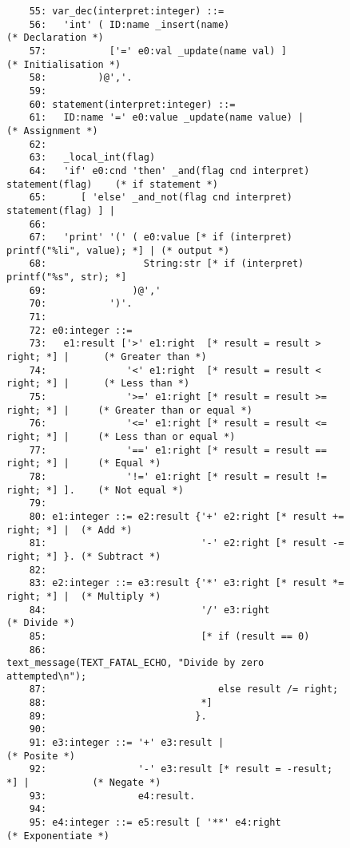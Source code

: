 \begin{figure}
\hspace*{-2cm}
\footnotesize
\begin{minipage}{30cm}
\begin{verbatim}
    55: var_dec(interpret:integer) ::=
    56:   'int' ( ID:name _insert(name)                                  (* Declaration *)
    57:           ['=' e0:val _update(name val) ]                        (* Initialisation *)
    58:         )@','.
    59: 
    60: statement(interpret:integer) ::=
    61:   ID:name '=' e0:value _update(name value) |                     (* Assignment *) 
    62: 
    63:   _local_int(flag)
    64:   'if' e0:cnd 'then' _and(flag cnd interpret) statement(flag)    (* if statement *)
    65:      [ 'else' _and_not(flag cnd interpret) statement(flag) ] |
    66: 
    67:   'print' '(' ( e0:value [* if (interpret) printf("%li", value); *] | (* output *)
    68:                 String:str [* if (interpret) printf("%s", str); *]
    69:               )@','
    70:           ')'.
    71: 
    72: e0:integer ::=
    73:   e1:result ['>' e1:right  [* result = result > right; *] |      (* Greater than *)
    74:              '<' e1:right  [* result = result < right; *] |      (* Less than *)
    75:              '>=' e1:right [* result = result >= right; *] |     (* Greater than or equal *)
    76:              '<=' e1:right [* result = result <= right; *] |     (* Less than or equal *)
    77:              '==' e1:right [* result = result == right; *] |     (* Equal *)
    78:              '!=' e1:right [* result = result != right; *] ].    (* Not equal *)
    79: 
    80: e1:integer ::= e2:result {'+' e2:right [* result += right; *] |  (* Add *)
    81:                           '-' e2:right [* result -= right; *] }. (* Subtract *)
    82: 
    83: e2:integer ::= e3:result {'*' e3:right [* result *= right; *] |  (* Multiply *)
    84:                           '/' e3:right                           (* Divide *) 
    85:                           [* if (result == 0)       
    86:                                text_message(TEXT_FATAL_ECHO, "Divide by zero attempted\n"); 
    87:                              else result /= right; 
    88:                           *] 
    89:                          }. 
    90: 
    91: e3:integer ::= '+' e3:result |                                   (* Posite *)
    92:                '-' e3:result [* result = -result; *] |           (* Negate *)
    93:                e4:result.
    94: 
    95: e4:integer ::= e5:result [ '**' e4:right                         (* Exponentiate *)

\end{verbatim}
\end{minipage}
\end{figure}

